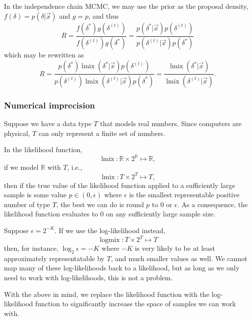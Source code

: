 \documentclass[
  11pt,
]{paper}
\begin{document}
In the independence chain MCMC, we may use the prior as the proposal
density, \(f(\delta) = p(\delta|\vec{x})\) and \(g = p\), and thus \[
  R = \frac{f(\delta^{*}) g(\delta^{(t)})}{f(\delta^{(t)})g(\delta^{*})} = \frac{p(\delta^{*}|\vec{x}) p(\delta^{(t)})}{p(\delta^{(t)}|\vec{x}) p(\delta^{*})}
\] which may be rewritten as \[
  R = \frac{p(\delta^{*}) \operatorname{lmix}(\delta^{*}|\vec{x}) p(\delta^{(t)})}{p(\delta^{(t)}) \operatorname{lmix}(\delta^{(t)}|\vec{x}) p(\delta^{*})} = \frac{\operatorname{lmix}(\delta^{*}|\vec{x})}{\operatorname{lmix}(\delta^{(t)}|\vec{x})}.
\]

\hypertarget{numerical-imprecision}{%
\subsubsection{Numerical imprecision}\label{numerical-imprecision}}

Suppose we have a data type \(T\) that models real numbers. Since
computers are physical, \(T\) can only represent a finite set of
numbers.

In the likelihood function, \[
  \operatorname{lmix} \colon \mathbb{R} \times 2^{\mathbb{R}} \mapsto \mathbb{R},
\] if we model \(\mathbb{R}\) with \(T\), i.e., \[
  \operatorname{lmix} \colon T \times 2^T \mapsto T,
\] then if the true value of the likelihood function applied to a
sufficiently large sample is some value \(p \in (0,\epsilon)\) where
\(\epsilon\) is the smallest representable positive number of type
\(T\), the best we can do is round \(p\) to \(0\) or \(\epsilon\). As a
consequence, the likelihood function evaluates to \(0\) on any
sufficiently large sample size.

Suppose \(\epsilon = 2^{-K}\). If we use the log-likelihood instead, \[
  \operatorname{logmix} \colon T \times 2^T \mapsto T
\] then, for instance, \(\log_2 \epsilon = -K\) where \(-K\) is very
likely to be at least approximately representatable by \(T\), and much
smaller values as well. We cannot map many of these log-likelihoods back
to a likelihood, but as long as we only need to work with
log-likelihoods, this is not a problem.

With the above in mind, we replace the likelihood function with the
log-likelihood function to significantly increase the space of samples
we can work with.
\end{document}
